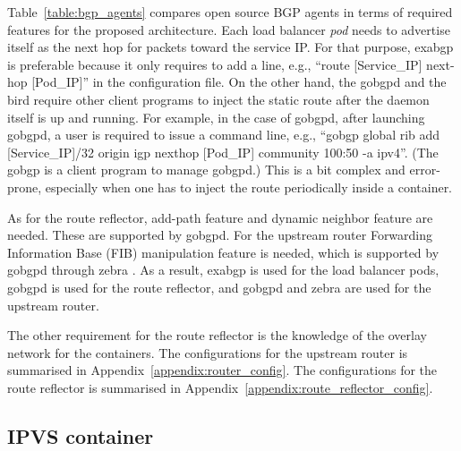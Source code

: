 Table~\ref{table:bgp_agents} compares open source BGP agents in terms of required features for the proposed architecture.
Each load balancer {\em pod} needs to advertise itself as the next hop for packets toward the service IP.
For that purpose, exabgp is preferable because it only requires to add a line, e.g., \enquote{route [Service\_IP] next-hop [Pod\_IP]} in the configuration file.
On the other hand, the gobgpd and the bird require other client programs to inject the static route after the daemon itself is up and running.
For example, in the case of gobgpd, after launching gobgpd, a user is required to issue a command line, e.g., \enquote{gobgp global rib add [Service\_IP]/32 origin igp nexthop [Pod\_IP] community 100:50 -a ipv4}.
 (The gobgp is a client program to manage gobgpd.)
This is a bit complex and error-prone, especially when one has to inject the route periodically inside a container.

As for the route reflector, add-path \cite{rfc7911} feature and dynamic neighbor feature are needed. These are supported by gobgpd.
For the upstream router Forwarding Information Base (FIB) manipulation \cite{exa-networks_2018} feature is needed, which is supported by gobgpd through zebra \cite{jakma2014introduction,osrg_gobgp_zebra}.
As a result, exabgp is used for the load balancer pods, gobgpd is used for the route reflector, and gobgpd and zebra are used for the upstream router.


The other requirement for the route reflector is the knowledge of the overlay network for the containers.
The configurations for the upstream router is summarised in Appendix~\ref{appendix:router_config}.
The configurations for the route reflector is summarised in Appendix~\ref{appendix:route_reflector_config}.

\subsection{IPVS container}\label{sec:ipvs}

